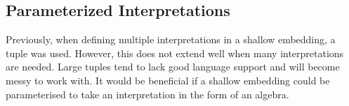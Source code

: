 \documentclass[a4paper, twocolumn, 10pt]{extarticle}
\newcommand\codeskip{\mskip\codemuskip}%
\let\codefont\textsf
\newcommand{\Conid}[1]{\mathit{#1}}
\newcommand{\Varid}[1]{\mathit{#1}}
\newcommand{\plus}{\mathbin{+\!\!\!+}}
\def\resethooks{%
  \global\let\SaveRestoreHook\empty
  \global\let\ColumnHook\empty}
\newlength{\blanklineskip}
\renewcommand\Varid[1]{\codefont{#1}}
\let\Conid\Varid
\begin{document}
\resethooks

\subsection{Parameterized Interpretations}


Previously, when defining multiple interpretations in a shallow embedding, a tuple was used.
However, this does not extend well when many interpretations are needed.
Large tuples tend to lack good language support and will become messy to work with.
It would be beneficial if a shallow embedding could be parameterised to take an interpretation in the form of an algebra.
\end{document}
